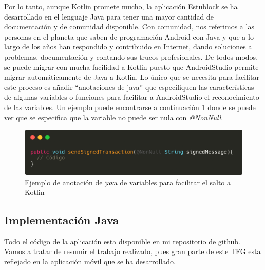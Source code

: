 Por lo tanto, aunque Kotlin promete mucho, la aplicación Estublock se ha desarrollado en el lenguaje Java para tener una mayor cantidad de documentación y de comunidad disponible. Con comunidad, nos referimos a las personas en el planeta que saben de programación Android con Java y que a lo largo de los años han respondido y contribuido en Internet, dando soluciones a problemas, documentación y contando sus trucos profesionales. De todos modos, se puede migrar con mucha facilidad a Kotlin puesto que AndroidStudio permite migrar automáticamente de Java a Kotlin. Lo único que se necesita para facilitar este proceso es añadir ``anotaciones de java'' que especifiquen las características de algunas variables o funciones para facilitar a AndroidStudio el reconocimiento de las variables. Un ejemplo puede encontrarse a continuación \ref{fig:nonNull} donde se puede ver que se especifica que la variable no puede ser nula con \emph{@NonNull}.


\begin{figure}[h!]
  \centering
  \includegraphics[width=0.9\linewidth]{figs/Desarrollo/nonNull}
  \caption[Facilitar el salto a Kotlin]{Ejemplo de anotación de java de variables para facilitar el salto a Kotlin}
  \label{fig:nonNull}
\end{figure}


\subsection{Implementación Java}

Todo el código de la aplicación esta disponible en mi repositorio de github\cite{forgis98}. Vamos a tratar de resumir el trabajo realizado, pues gran parte de este TFG esta reflejado en la aplicación móvil que se ha desarrollado. \\

